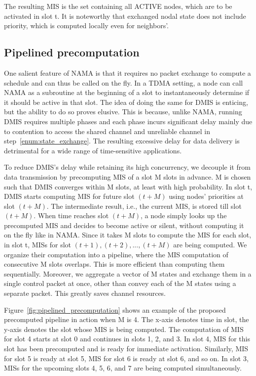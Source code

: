 \documentclass[conference]{IEEEtran}
\begin{document}
The resulting MIS is the set containing all ACTIVE nodes, which are to be activated in slot t. It is noteworthy that exchanged nodal state does not include priority, which is computed locally even for neighbors'.




\subsection{Pipelined precomputation}
One salient feature of NAMA is that it requires no packet exchange to compute a schedule and can thus be called on the fly. In a TDMA setting, a node can call NAMA as a subroutine at the beginning of a slot to instantaneously determine if it should be active in that slot. The idea of doing the same for DMIS is enticing, but the ability to do so proves elusive. This is because, 
unlike NAMA, running DMIS requires multiple phases and each phase incurs significant delay mainly due to contention to access the shared channel and unreliable channel in step~\ref{enum:state_exchange}. The resulting excessive delay for data delivery is detrimental for a wide range of time-sensitive applications.

To reduce DMIS's delay while retaining its high concurrency, we decouple it from data transmission by precomputing MIS of a slot M slots in advance. 
M is chosen such that DMIS converges within M slots, at least with high probability. In slot t, DMIS starts computing MIS for future slot $(t + M)$ using nodes' priorities at slot $(t + M)$. The intermediate result, i.e., the current MIS, is stored till slot $(t + M)$. When time reaches slot $(t + M)$, a node simply looks up the precomputed MIS and decides to become active or silent, without computing it on the fly like in NAMA.
Since it takes M slots to compute the MIS for each slot, in slot t, MISs for slot $(t + 1), (t + 2), ..., (t + M)$ are being computed. We organize their computation into a pipeline, where the MIS computation of consecutive M slots overlaps. This is more efficient than computing them sequentially. Moreover, we aggregate a vector of M states and exchange them in a single control packet at once, other than convey each of the M states using a separate packet. This greatly saves channel resources.

Figure~\ref{fig:pipelined_precomputation} shows an example of the proposed precomputed pipeline in action when M is 4. The x-axis denotes time in slot, the y-axis denotes the slot whose MIS is being computed. The computation of MIS for slot 4 starts at slot 0 and continues in slots 1, 2, and 3. In slot 4, MIS for this slot has been precomputed and is ready for immediate activation. Similarly, MIS for slot 5 is ready at slot 5, MIS for slot 6 is ready at slot 6, and so on. In slot 3, MISs for the upcoming slots 4, 5, 6, and 7 are being computed simultaneously.
\end{document}
